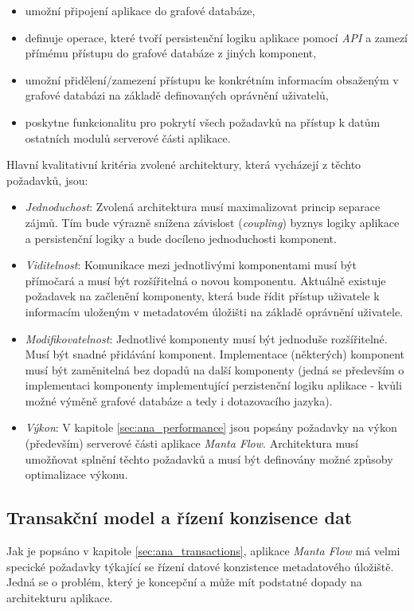 \begin{itemize}
   \item umožní připojení aplikace do grafové databáze,
   \item definuje operace, které tvoří persistenční logiku aplikace pomocí \textit{API} a zamezí přímému přístupu do grafové databáze z jiných komponent,
   \item umožní přidělení/zamezení přístupu ke konkrétním informacím obsaženým v grafové databázi na základě definovaných oprávnění uživatelů,
   \item poskytne funkcionalitu pro pokrytí všech požadavků na přístup k datům ostatních modulů serverové části aplikace.
\end{itemize}

Hlavní kvalitativní kritéria zvolené architektury, která vycházejí z těchto požadavků, jsou:

\begin{itemize}
   \item{\textit{Jednoduchost}}: Zvolená architektura musí maximalizovat princip separace zájmů. Tím bude výrazně snížena závislost (\textit{coupling}) byznys logiky aplikace a persistenční logiky a bude docíleno jednoduchosti komponent.
   \item{\textit{Viditelnost}}: Komunikace mezi jednotlivými komponentami musí být přímočará a musí být rozšířitelná o novou komponentu. Aktuálně existuje požadavek na začlenění komponenty, která bude řídit přístup uživatele k informacím uloženým v metadatovém úložišti na základě oprávnění uživatele.
   \item{\textit{Modifikovatelnost}}: Jednotlivé komponenty musí být jednoduše rozšířitelné. Musí být snadné přidávání komponent. Implementace (některých) komponent musí být zaměnitelná bez dopadů na další komponenty (jedná se především o implementaci komponenty implementující perzistenční logiku aplikace - kvůli možné výměně grafové databáze a tedy i dotazovacího jazyka).
   \item{\textit{Výkon}}: V kapitole \ref{sec:ana_performance} jsou popsány požadavky na výkon (především) serverové části aplikace \textit{Manta Flow}. Architektura musí umožňovat splnění těchto požadavků a musí být definovány možné způsoby optimalizace výkonu.
\end{itemize}

\subsection{Transakční model a řízení konzisence dat}
\label{sec:des_transactions}
Jak je popsáno v kapitole \ref{sec:ana_transactions}, aplikace \textit{Manta Flow} má velmi specické požadavky týkající se řízení datové konzistence metadatového úložiště. Jedná se o problém, který je koncepční a může mít podstatné dopady na architekturu aplikace.

